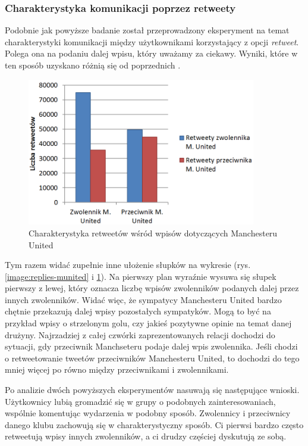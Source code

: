 \subsubsection{Charakterystyka komunikacji poprzez retweety}
Podobnie jak powyższe badanie został przeprowadzony eksperyment na temat 
charakterystyki komunikacji między użytkownikami korzystający z opcji 
\textit{retweet}. Polega ona na podaniu dalej wpisu, który uważamy za ciekawy.
Wyniki, które w ten sposób uzyskano różnią się od poprzednich
.

\begin{figure}[ht!]
\centering
\includegraphics[width=100mm]{img/retweety-munited.png}
\caption{Charakterystyka retweetów wśród wpisów dotyczących Manchesteru United}
\label{image:retweety-munited}
\end{figure}


Tym razem widać zupełnie inne ułożenie słupków na wykresie (rys.
\ref{image:replies-munited} i \ref{image:retweety-munited}).
Na pierwszy plan wyraźnie wysuwa się słupek pierwszy z lewej, który oznacza
liczbę wpisów zwolenników podanych dalej przez innych zwolenników. Widać więc,
że sympatycy Manchesteru United bardzo chętnie przekazują dalej wpisy 
pozostałych sympatyków. Mogą to być na przykład wpisy o strzelonym golu,
czy jakieś pozytywne opinie na temat danej drużyny. Najrzadziej z całej
czwórki zaprezentowanych relacji dochodzi do sytuacji, gdy przeciwnik
Manchseteru podaje dalej wpis zwolennika. Jeśli chodzi o retweetowanie
tweetów przeciwników Manchesteru United, to dochodzi do tego mniej więcej po
równo między przeciwnikami i zwolennikami.

Po analizie dwóch powyższych eksperymentów nasuwają się następujące wnioski.
Użytkownicy lubią gromadzić się w grupy o podobnych zainteresowaniach,
wspólnie komentując wydarzenia w podobny sposób. Zwolennicy i przeciwnicy
danego klubu zachowują się w charakterystyczny sposób. Ci pierwsi bardzo często
retweetują wpisy innych zwolenników, a ci drudzy częściej dyskutują ze sobą.




